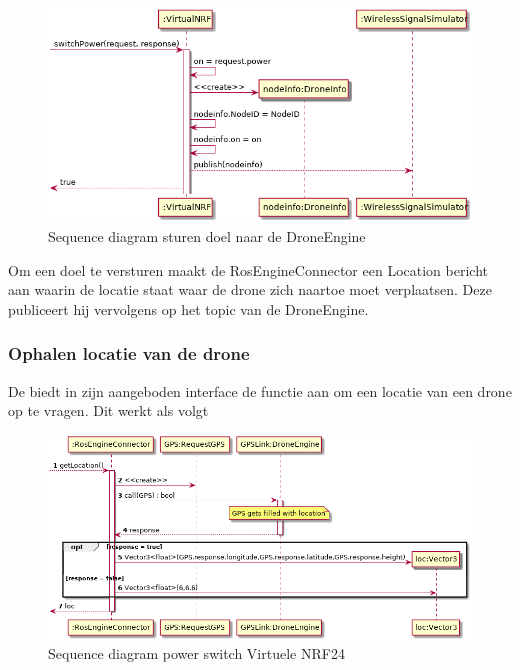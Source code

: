 \documentclass[a4paper, 11pt, oneside]{report}
\begin{document}
\begin{figure}[H]
	\begin{center}\includegraphics[width=.8\linewidth]{UML/out/ros/sequence/powerSwitch/powerSwitch.png}\end{center}
	\caption{Sequence diagram sturen doel naar de DroneEngine}
	\label{fig:ros:sequence:sequence:sturendoelnaarengine}
\end{figure}

Om een doel te versturen maakt de RosEngineConnector een Location bericht aan waarin de locatie staat waar de drone zich naartoe moet verplaatsen.
Deze publiceert hij vervolgens op het topic van de DroneEngine.

\subsubsection{Ophalen locatie van de drone}
\label{DetailedDesign:ros:sequence:ophalenlocatie}

De  biedt in zijn aangeboden interface de functie aan om een locatie van een drone op te vragen. Dit werkt als volgt

\begin{figure}[H]
	\begin{center}\includegraphics[width=.9\linewidth]{UML/out/ros/sequence/getLocation/getLocation.png}\end{center}
	\caption{Sequence diagram power switch Virtuele NRF24}
	\label{fig:ros:sequence:sequence:ophalenlocatie}
\end{figure}
\end{document}
